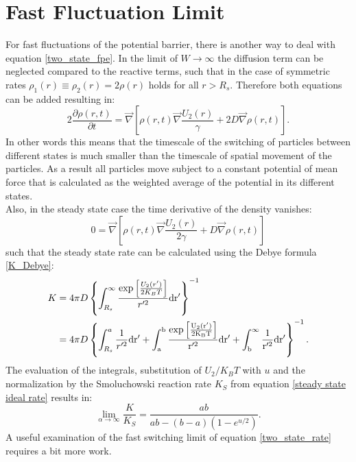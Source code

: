 \section{Fast Fluctuation Limit}
\label{lim_short_rd}
For fast fluctuations of the potential barrier, there is another way to deal with equation \eqref{two_state_fpe}. In the limit of $W \rightarrow \infty$ the diffusion term can be neglected compared to the reactive terms, such that in the case of symmetric rates $\rho_1(r) \equiv \rho_2(r) = 2\rho(r)$ holds for all $r>R_s$. Therefore both equations can be added resulting in: 
\begin{equation}
    2 \frac{\partial \rho(r,t)}{\partial t} = \vec \nabla \left[\rho(r,t) \vec \nabla \frac{U_2(r)}{\gamma} + 2 D \vec \nabla \rho(r,t) \right].
    \label{fast_limit_fpe}
\end{equation} 
In other words this means that the timescale of the switching of particles between different states is much smaller than the timescale of spatial movement of the particles. As a result all particles move subject to a constant potential of mean force that is calculated as the weighted average of the potential in its different states. \\
Also, in the steady state case the time derivative of the density vanishes:
\begin{equation}
    0 = \vec \nabla \left[\rho(r,t) \vec \nabla \frac{U_2(r)}{2\gamma} + D \vec \nabla \rho(r,t) \right]
\end{equation}
such that the steady state rate can be calculated using the Debye formula \eqref{K_Debye}:
\begin{align}
    K &=  4 \pi D \left\{\int_{R_s}^{\infty} \frac{\exp \left[ \frac{U_2(r')}{2 K_B T}\right]}{r'^2} \rm d r' \right\}^{-1} \nonumber \\
    &= 4 \pi D \left\{\int_{R_s}^{a} \frac{1}{r'^2} \rm d r' + \int_{a}^{b} \frac{\exp \left[ \frac{U_2(r')}{2K_B T}\right]}{r'^2} \rm d r' + \int_{b}^{\infty} \frac{1}{r'^2} \rm d r' \right\}^{-1}.
    \label{mean_potential_rate}
\end{align}
The evaluation of the integrals, substitution of $U_2/K_B T$ with $u$ and the normalization by the Smoluchowski reaction rate $K_S$ from equation \eqref{steady state ideal rate} results in:
\begin{equation}
    \lim_{\alpha \rightarrow \infty} \frac{K}{K_S} = \frac{ab}{ab - (b-a)(1-e^{u/2})}.
    \label{K_fast_limit_1}
\end{equation}
A useful examination of the fast switching limit of equation \eqref{two_state_rate} requires a bit more work.
